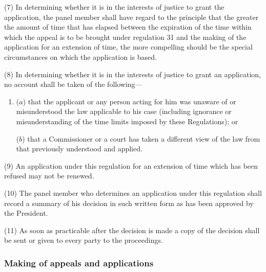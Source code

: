 \documentclass[12pt,a4paper]{article}
\begin{document}
(7) In determining whether it is in the interests of justice to grant the application, the panel member shall have regard to the principle that the greater the amount of time that has elapsed between the expiration of the time within which the appeal is to be brought under regulation 31 and the making of the application for an extension of time, the more compelling should be the special circumstances on which the application is based.

(8) In determining whether it is in the interests of justice to grant an application, no account shall be taken of the following—
\begin{enumerate}\item[]
($a$) that the applicant or any person acting for him was unaware of or misunderstood the law applicable to his case (including ignorance or misunderstanding of the time limits imposed by these Regulations); or

($b$) that a Commissioner or a court has taken a different view of the law from that previously understood and applied.
\end{enumerate}

(9) An application under this regulation for an extension of time which has been refused may not be renewed.

(10) The panel member who determines an application under this regulation shall record a summary of his decision in such written form as has been approved by the President.

(11) As soon as practicable after the decision is made a copy of the decision shall be sent or given to every party to the proceedings.

\subsubsection[33. Making of appeals and applications]{Making of appeals and applications}
\end{document}
